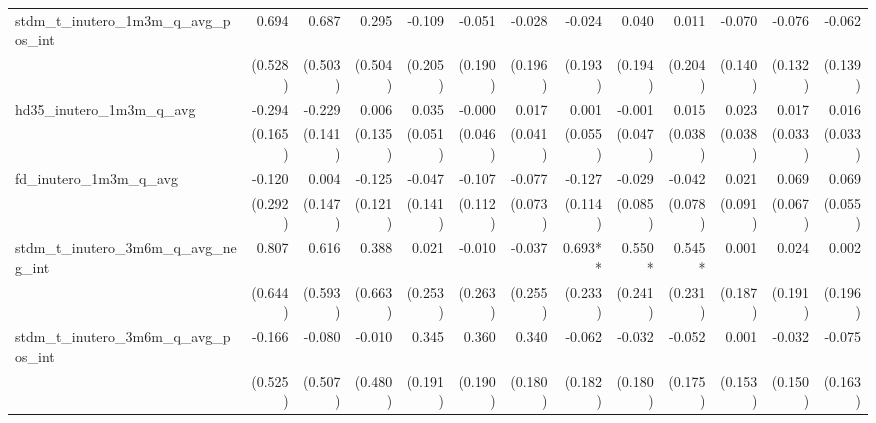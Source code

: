 \begin{tabular}{lrrrrrrrrrrrr}
stdm\_t\_inutero\_1m3m\_q\_avg\_pos\_int    &        0.694 &        0.687 &        0.295 &       -0.109 &       -0.051 &       -0.028 &       -0.024 &        0.040 &        0.011 &       -0.070 &       -0.076 &       -0.062 \\ 
                                            &      (0.528) &      (0.503) &      (0.504) &      (0.205) &      (0.190) &      (0.196) &      (0.193) &      (0.194) &      (0.204) &      (0.140) &      (0.132) &      (0.139) \\ 
hd35\_inutero\_1m3m\_q\_avg                 &       -0.294 &       -0.229 &        0.006 &        0.035 &       -0.000 &        0.017 &        0.001 &       -0.001 &        0.015 &        0.023 &        0.017 &        0.016 \\ 
                                            &      (0.165) &      (0.141) &      (0.135) &      (0.051) &      (0.046) &      (0.041) &      (0.055) &      (0.047) &      (0.038) &      (0.038) &      (0.033) &      (0.033) \\ 
fd\_inutero\_1m3m\_q\_avg                   &       -0.120 &        0.004 &       -0.125 &       -0.047 &       -0.107 &       -0.077 &       -0.127 &       -0.029 &       -0.042 &        0.021 &        0.069 &        0.069 \\ 
                                            &      (0.292) &      (0.147) &      (0.121) &      (0.141) &      (0.112) &      (0.073) &      (0.114) &      (0.085) &      (0.078) &      (0.091) &      (0.067) &      (0.055) \\ 
stdm\_t\_inutero\_3m6m\_q\_avg\_neg\_int    &        0.807 &        0.616 &        0.388 &        0.021 &       -0.010 &       -0.037 &      0.693** &       0.550* &       0.545* &        0.001 &        0.024 &        0.002 \\ 
                                            &      (0.644) &      (0.593) &      (0.663) &      (0.253) &      (0.263) &      (0.255) &      (0.233) &      (0.241) &      (0.231) &      (0.187) &      (0.191) &      (0.196) \\ 
stdm\_t\_inutero\_3m6m\_q\_avg\_pos\_int    &       -0.166 &       -0.080 &       -0.010 &        0.345 &        0.360 &        0.340 &       -0.062 &       -0.032 &       -0.052 &        0.001 &       -0.032 &       -0.075 \\ 
                                            &      (0.525) &      (0.507) &      (0.480) &      (0.191) &      (0.190) &      (0.180) &      (0.182) &      (0.180) &      (0.175) &      (0.153) &      (0.150) &      (0.163) \\ 

\end{tabular}
